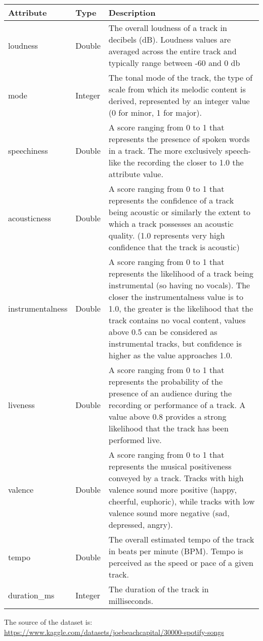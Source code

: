 \begin{table}[h!]
	\begin{center}
		\hspace*{-1cm}
		\begin{tabular}{|m{8em}|m{4em}|m{29em}|}
		\hline
		\textbf{Attribute} & \textbf{Type} & \textbf{Description}\\
		\hline
			loudness & Double & The overall loudness of a track in decibels (dB). Loudness values are averaged across the entire track and typically range between -60 and 0 db\\
		\hline
			mode & Integer & The tonal mode of the track, the type of scale from which its melodic content is derived, represented by an integer value (0 for minor, 1 for major).\\
		\hline
			speechiness & Double & A score ranging from 0 to 1 that represents the presence of spoken words in a track. The more exclusively speech-like the recording the closer to 1.0 the attribute value.\\
		\hline
			acousticness & Double & A score ranging from 0 to 1 that represents the confidence of a track being acoustic or similarly the extent to which a track possesses an acoustic quality. (1.0 represents very high confidence that the track is acoustic)\\
		\hline
			instrumentalness & Double & A score ranging from 0 to 1 that represents the likelihood of a track being instrumental (so having no vocals). The closer the instrumentalness value is to 1.0, the greater is the likelihood that the track contains no vocal content, values above 0.5 can be considered as instrumental tracks, but confidence is higher as the value approaches 1.0.\\
		\hline
			liveness & Double & A score ranging from 0 to 1 that represents the probability of the presence of an audience during the recording or performance of a track. A value above 0.8 provides a strong likelihood that the track has been performed live.\\
		\hline
			valence & Double & A score ranging from 0 to 1 that represents the musical positiveness conveyed by a track. Tracks with high valence sound more positive (happy, cheerful, euphoric), while tracks with low valence sound more negative (sad, depressed, angry).\\
		\hline
			tempo & Double & The overall estimated tempo of the track in beats per minute (BPM). Tempo is perceived as the speed or pace of a given track.\\
		\hline
			duration\_ms & Integer & The duration of the track in milliseconds.\\
		\hline
		\end{tabular}
		\hspace*{1cm}
	\end{center}
\end{table}
The source of the dataset is:\\
\url{https://www.kaggle.com/datasets/joebeachcapital/30000-spotify-songs}
\newpage
